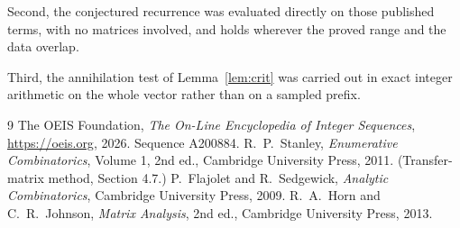 \documentclass[11pt,a4paper]{article}
\theoremstyle{plain}
\theoremstyle{definition}
\begin{document}
Second, the conjectured recurrence was evaluated directly on those published terms, with no
matrices involved, and holds wherever the proved range and the data overlap.

Third, the annihilation test of Lemma~\ref{lem:crit} was carried out in exact integer
arithmetic on the whole vector rather than on a sampled prefix.

\begin{thebibliography}{9}
 The OEIS Foundation, \emph{The On-Line Encyclopedia of Integer
Sequences}, \url{https://oeis.org}, 2026. Sequence A200884.
 R.~P.~Stanley, \emph{Enumerative Combinatorics}, Volume 1, 2nd ed.,
Cambridge University Press, 2011. (Transfer-matrix method, Section 4.7.)
 P.~Flajolet and R.~Sedgewick, \emph{Analytic Combinatorics}, Cambridge
University Press, 2009.
 R.~A.~Horn and C.~R.~Johnson, \emph{Matrix Analysis}, 2nd ed., Cambridge
University Press, 2013.
\end{thebibliography}
\end{document}
